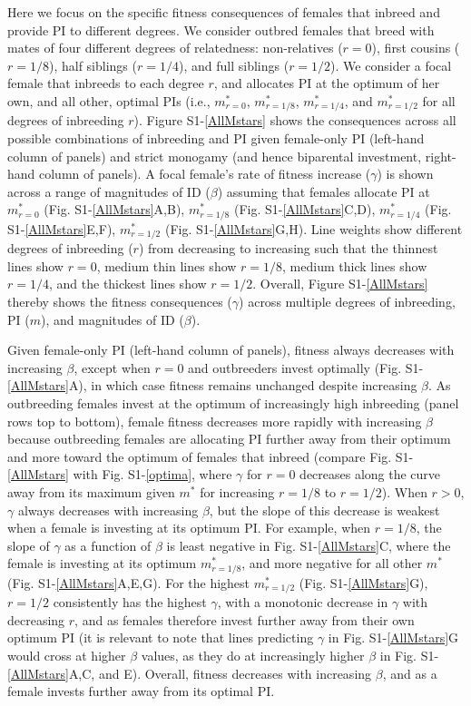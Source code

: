 \documentclass[12pt]{article}
\begin{document}
Here we focus on the specific fitness consequences of females that inbreed and provide PI to different degrees. We consider outbred females that breed with mates of four different degrees of relatedness: non-relatives ($r=0$), first cousins ($r=1/8$), half siblings ($r=1/4$), and full siblings ($r=1/2$). We consider a focal female that inbreeds to each degree $r$, and allocates PI at the optimum of her own, and all other, optimal PIs (i.e., $m^{*}_{r=0}$, $m^{*}_{r=1/8}$, $m^{*}_{r=1/4}$, and $m^{*}_{r=1/2}$ for all degrees of inbreeding $r$). Figure S1-\ref{AllMstars} shows the consequences across all possible combinations of inbreeding and PI given female-only PI (left-hand column of panels) and strict monogamy (and hence biparental investment, right-hand column of panels). A focal female's rate of fitness increase ($\gamma$) is shown across a range of magnitudes of ID ($\beta$) assuming that females allocate PI at $m^{*}_{r=0}$ (Fig. S1-\ref{AllMstars}A,B), $m^{*}_{r=1/8}$ (Fig. S1-\ref{AllMstars}C,D), $m^{*}_{r=1/4}$ (Fig. S1-\ref{AllMstars}E,F), $m^{*}_{r=1/2}$ (Fig. S1-\ref{AllMstars}G,H). Line weights show different degrees of inbreeding ($r$) from decreasing to increasing such that the thinnest lines show $r=0$, medium thin lines show $r=1/8$, medium thick lines show $r=1/4$, and the thickest lines show $r=1/2$. Overall, Figure S1-\ref{AllMstars} thereby shows the fitness consequences ($\gamma$) across multiple degrees of inbreeding, PI ($m$), and magnitudes of ID ($\beta$).

Given female-only PI (left-hand column of panels), fitness always decreases with increasing $\beta$, except when $r=0$ and outbreeders invest optimally (Fig. S1-\ref{AllMstars}A), in which case fitness remains unchanged despite increasing $\beta$. As outbreeding females invest at the optimum of increasingly high inbreeding (panel rows top to bottom), female fitness decreases more rapidly with increasing $\beta$ because outbreeding females are allocating PI further away from their optimum and more toward the optimum of females that inbreed (compare Fig. S1-\ref{AllMstars} with Fig. S1-\ref{optima}, where $\gamma$ for $r=0$ decreases along the curve away from its maximum given $m^{*}$ for increasing $r=1/8$ to $r=1/2$). When $r>0$, $\gamma$ always decreases with increasing $\beta$, but the slope of this decrease is weakest when a female is investing at its optimum PI. For example, when $r=1/8$, the slope of $\gamma$ as a function of $\beta$ is least negative in Fig. S1-\ref{AllMstars}C, where the female is investing at its optimum $m^{*}_{r=1/8}$, and more negative for all other $m^{*}$ (Fig. S1-\ref{AllMstars}A,E,G). For the highest $m^{*}_{r=1/2}$ (Fig. S1-\ref{AllMstars}G), $r=1/2$ consistently has the highest $\gamma$, with a monotonic decrease in $\gamma$ with decreasing $r$, and as females therefore invest further away from their own optimum PI (it is relevant to note that lines predicting $\gamma$ in Fig. S1-\ref{AllMstars}G would cross at higher $\beta$ values, as they do at increasingly higher $\beta$ in Fig. S1-\ref{AllMstars}A,C, and E). Overall, fitness decreases with increasing $\beta$, and as a female invests further away from its optimal PI.
\end{document}
